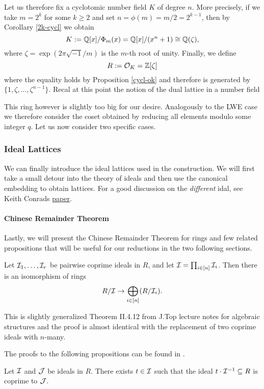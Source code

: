 Let us therefore fix a cyclotomic number field $K$ of degree $n$. More precisely, if we take $m = 2^k$ for some $k \geq 2$ and set $n = \phi(m) = m/2 = 2^{k-1}$, then by Corollary \ref{2k-cycl} we obtain
\[ K := \mathbb{Q}[x]/\Phi_m(x) = \mathbb{Q}[x]/(x^n + 1) \cong \mathbb{Q}(\zeta), \]
where $\zeta = \exp(2 \pi \sqrt{-1}/m)$ is the $m$-th root of unity. Finally, we define
\begin{equation} R := \mathcal{O}_K = \mathbb{Z}[\zeta] \end{equation}
where the equality holds by Proposition \ref{cycl-ok} and therefore is generated by $\{1, \zeta, \dots, \zeta^{n-1} \}$. Recal at this point the notion of the dual lattice in a number field

This ring however is slightly too big for our desire. Analogously to the LWE case we therefore consider the coset obtained by reducing all elements modulo some integer $q$. Let us now consider two specific cases.
\subsubsection*{Ideal Lattices}
We can finally introduce the ideal lattices used in the construction. We will first take a small detour into the theory of ideals and then use the canonical embedding to obtain lattices. For a good discussion on the \textit{different} idal, see Keith Conrads \href{https://kconrad.math.uconn.edu/blurbs/gradnumthy/different.pdf}{paper}.


\paragraph{Chinese Remainder Theorem}
Lastly, we will present the Chinese Remainder Theorem for rings and few related propositions that will be useful for our reductions in the two following sections.

\begin{proposition}\label{crt}
	Let $\mathcal{I}_1, \ldots, \mathcal{I}_r$ be pairwise coprime ideals in $R$, and let $\mathcal{I} = \prod_{i \in [n]} \mathcal{I}_i$. Then there is an isomorphism of rings
	\[ R/\mathcal{I} \rightarrow \bigoplus_{i \in [n]} (R/\mathcal{I}_i). \]
\end{proposition}
This is slightly generalized Theorem II.4.12 from J.Top lecture notes for algebraic structures and the proof is almost identical with the replacement of two coprime ideals with $n$-many.

The proofs to the following propositions can be found in \cite{ring-lwe}.
\begin{proposition}
	Let $\mathcal{I}$ and $\mathcal{J}$ be ideals in $R$. There exists $t \in \mathcal{I}$ such that the ideal $t \cdot \mathcal{I}^{-1} \subseteq R$ is coprime to $\mathcal{J}$.
\end{proposition}

